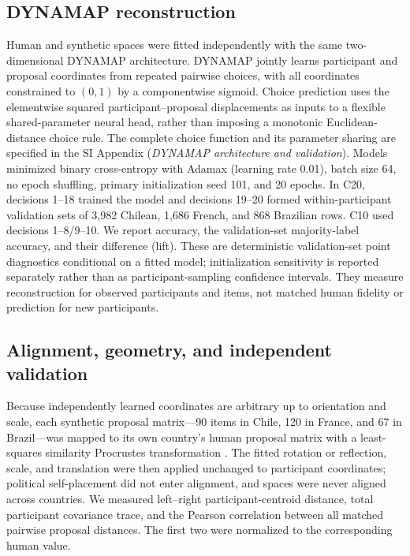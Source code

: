 \documentclass[unnumsec,webpdf,modern,large]{oup-authoring-template}
\begin{document}
\subsection{DYNAMAP reconstruction}


Human and synthetic spaces were fitted independently with the same two-dimensional DYNAMAP architecture. DYNAMAP jointly learns participant and proposal coordinates from repeated pairwise choices, with all coordinates constrained to $(0,1)$ by a componentwise sigmoid. Choice prediction uses the elementwise squared participant--proposal displacements as inputs to a flexible shared-parameter neural head, rather than imposing a monotonic Euclidean-distance choice rule. The complete choice function and its parameter sharing are specified in the SI Appendix (\textit{DYNAMAP architecture and validation}). Models minimized binary cross-entropy with Adamax (learning rate 0.01), batch size 64, no epoch shuffling, primary initialization seed 101, and 20 epochs. In C20, decisions 1--18 trained the model and decisions 19--20 formed within-participant validation sets of 3,982 Chilean, 1,686 French, and 868 Brazilian rows. C10 used decisions 1--8/9--10. We report accuracy, the validation-set majority-label accuracy, and their difference (lift). These are deterministic validation-set point diagnostics conditional on a fitted model; initialization sensitivity is reported separately rather than as participant-sampling confidence intervals. They measure reconstruction for observed participants and items, not matched human fidelity or prediction for new participants.

\subsection{Alignment, geometry, and independent validation}

Because independently learned coordinates are arbitrary up to orientation and scale, each synthetic proposal matrix---90 items in Chile, 120 in France, and 67 in Brazil---was mapped to its own country's human proposal matrix with a least-squares similarity Procrustes transformation \citep{Schonemann1966}. The fitted rotation or reflection, scale, and translation were then applied unchanged to participant coordinates; political self-placement did not enter alignment, and spaces were never aligned across countries. We measured left--right participant-centroid distance, total participant covariance trace, and the Pearson correlation between all matched pairwise proposal distances. The first two were normalized to the corresponding human value.
\end{document}
